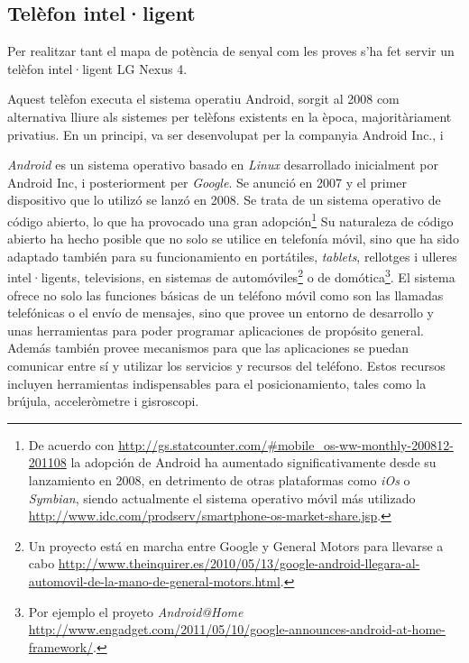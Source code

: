 
\subsection{Telèfon intel·ligent}

Per realitzar tant el mapa de potència de senyal com les proves s'ha fet servir un telèfon intel·ligent LG Nexus 4.

Aquest telèfon executa el sistema operatiu Android, sorgit al 2008 com alternativa lliure als sistemes per telèfons existents en la època, majoritàriament privatius. En un principi, va ser desenvolupat per la companyia Android Inc., i


\textit{Android} es un sistema operativo basado en \textit{Linux} desarrollado inicialment por Android Inc, i posteriorment per \textit{Google}. Se anunció en 2007 y el primer dispositivo que lo utilizó se lanzó en 2008. Se trata de un sistema operativo de código abierto, lo que ha provocado una gran adopción\footnote{De acuerdo con \url{http://gs.statcounter.com/\#mobile_os-ww-monthly-200812-201108} la adopción de Android ha aumentado significativamente desde su lanzamiento en 2008, en detrimento de otras plataformas como \textit{iOs} o \textit{Symbian}, siendo actualmente el sistema operativo móvil más utilizado \url{http://www.idc.com/prodserv/smartphone-os-market-share.jsp}.} Su naturaleza de código abierto ha hecho posible que no solo se utilice en telefonía móvil, sino que ha sido adaptado también para su funcionamiento en portátiles, \textit{tablets}, rellotges i ulleres intel·ligents, televisions, en sistemas de automóviles\footnote{Un proyecto está en marcha entre Google y General Motors para llevarse a cabo \url{http://www.theinquirer.es/2010/05/13/google-android-llegara-al-automovil-de-la-mano-de-general-motors.html}.} o de domótica\footnote{Por ejemplo el proyeto \textit{Android@Home} \url{http://www.engadget.com/2011/05/10/google-announces-android-at-home-framework/}.}. El sistema ofrece no solo las funciones básicas de un teléfono móvil como son las llamadas telefónicas o el envío de mensajes, sino que provee un entorno de desarrollo y unas herramientas para poder programar aplicaciones de propósito general. Además también provee mecanismos para que las aplicaciones se puedan comunicar entre sí y utilizar los servicios y recursos del teléfono. Estos recursos incluyen herramientas indispensables para el posicionamiento, tales como la brújula, acceleròmetre i gisroscopi.  \newline

